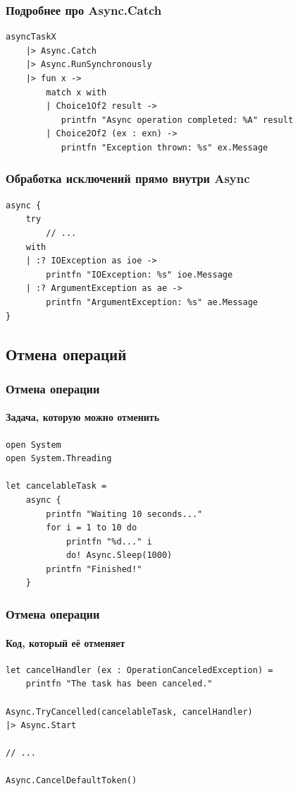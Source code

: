 \documentclass[xetex,mathserif,serif]{beamer}
\begin{document}
    \begin{frame}[fragile]
        \frametitle{Подробнее про Async.Catch}
        \begin{verbatim}
asyncTaskX
    |> Async.Catch
    |> Async.RunSynchronously
    |> fun x ->
        match x with
        | Choice1Of2 result -> 
           printfn "Async operation completed: %A" result
        | Choice2Of2 (ex : exn) -> 
           printfn "Exception thrown: %s" ex.Message
        \end{verbatim}
    \end{frame}
    
    \begin{frame}[fragile]
        \frametitle{Обработка исключений прямо внутри Async}
        \begin{verbatim}
async {
    try
        // ...
    with
    | :? IOException as ioe ->
        printfn "IOException: %s" ioe.Message
    | :? ArgumentException as ae ->
        printfn "ArgumentException: %s" ae.Message
}
        \end{verbatim}
    \end{frame}

    \subsection{Отмена операций}

    \begin{frame}[fragile]
        \frametitle{Отмена операции}
        \framesubtitle{Задача, которую можно отменить}
        \begin{verbatim}
open System
open System.Threading

let cancelableTask =
    async {
        printfn "Waiting 10 seconds..."
        for i = 1 to 10 do
            printfn "%d..." i
            do! Async.Sleep(1000)
        printfn "Finished!"
    }
        \end{verbatim}
    \end{frame}

    \begin{frame}[fragile]
        \frametitle{Отмена операции}
        \framesubtitle{Код, который её отменяет}
        \begin{verbatim}
let cancelHandler (ex : OperationCanceledException) =
    printfn "The task has been canceled."

Async.TryCancelled(cancelableTask, cancelHandler)
|> Async.Start

// ...

Async.CancelDefaultToken()
        \end{verbatim}
    \end{frame}
\end{document}
